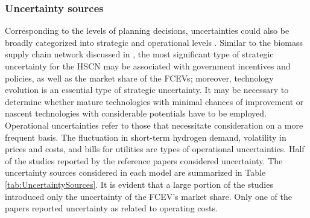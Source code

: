 \documentclass[11pt,3p]{elsarticle}
\begin{document}
\subsubsection{Uncertainty sources}

Corresponding to the levels of planning decisions, uncertainties could also be broadly categorized into strategic and operational levels \citep{yue2014biomass}. Similar to the biomass supply chain network discussed in \citep{yue2014biomass}, the most significant type of strategic uncertainty for the HSCN may be associated with government incentives and policies, as well as the market share of the FCEVs; moreover, technology evolution is an essential type of strategic uncertainty. It may be necessary to determine whether mature technologies with minimal chances of improvement or nascent technologies with considerable potentials have to be employed. Operational uncertainties refer to those that necessitate consideration on a more frequent basis. The fluctuation in short-term hydrogen demand, volatility in prices and costs, and bills for utilities are types of operational uncertainties. Half of the studies reported by the reference papers considered uncertainty. The uncertainty sources considered in each model are summarized in Table \ref{tab:UncertaintySources}. It is evident that a large portion of the studies introduced only the uncertainty of the FCEV's market share. Only one of the papers reported uncertainty as related to operating costs. 
\end{document}
